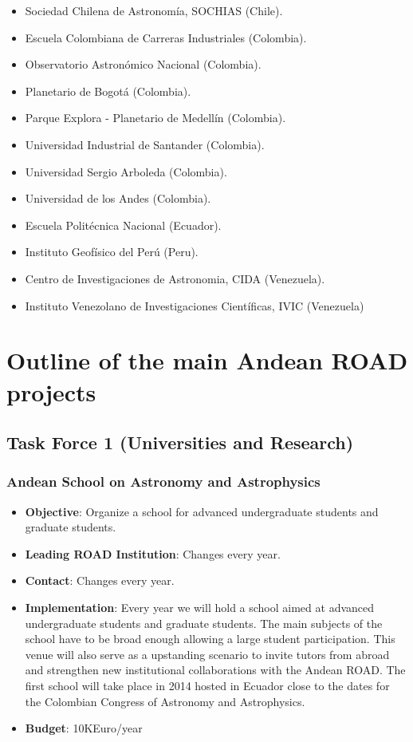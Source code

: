\documentclass[12pt]{article}
\begin{document}
\begin{itemize}
\item {Sociedad Chilena de Astronom\'ia, SOCHIAS (Chile).}
\item {Escuela Colombiana de Carreras Industriales (Colombia).}
\item {Observatorio Astron\'omico Nacional (Colombia).}
\item {Planetario de Bogot\'a (Colombia).}
\item {Parque Explora - Planetario de Medell\'in (Colombia).}
\item {Universidad Industrial de Santander (Colombia).}
\item {Universidad Sergio Arboleda (Colombia).}
\item {Universidad de los Andes (Colombia).}
\item {Escuela Polit\'ecnica Nacional (Ecuador).}
\item {Instituto Geof\'isico del Per\'u (Peru).}
\item {Centro de Investigaciones de Astronomia, CIDA (Venezuela).}
\item {Instituto Venezolano de Investigaciones Cient\'ificas, IVIC (Venezuela)}
\end{itemize}




\section{Outline of the main Andean ROAD projects}

\subsection{Task Force 1 (Universities and Research)}

\subsubsection{Andean School on Astronomy and Astrophysics}

\begin{itemize}

\item{\bf Objective}: Organize a school for advanced undergraduate
  students and graduate students.
\item{\bf Leading ROAD Institution}: Changes every year.
\item{\bf Contact}: Changes every year.
\item{\bf Implementation}:
Every year we will hold a school aimed at
  advanced undergraduate students and graduate students. The main
  subjects of the school have to be broad enough allowing a large
  student participation. This venue will also serve as a upstanding
  scenario to invite tutors from abroad and strengthen new
  institutional collaborations with the Andean ROAD. The first school
  will take place in 2014 hosted in Ecuador close to the dates for the
  Colombian Congress of Astronomy and Astrophysics.  
\item{\bf Budget}: 10KEuro/year
\end{itemize}
\end{document}
